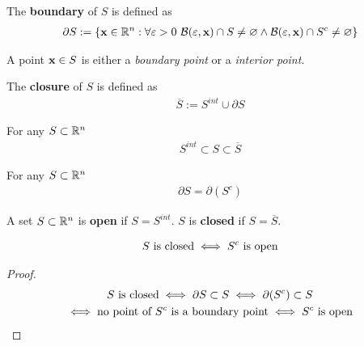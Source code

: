 \documentclass[11pt]{article}
\begin{document}
			\begin{definition}
				The \textbf{boundary} of $S$ is defined as
				\begin{gather}
					\partial S := \{\textbf{x} \in \mathbb{R}^n: \forall \varepsilon > 0\ \mathcal{{B}}(\varepsilon, \textbf{x}) \cap S \neq \varnothing \land \mathcal{{B}}(\varepsilon, \textbf{x}) \cap S^c \neq \varnothing \}
				\end{gather}
			\end{definition}
			
			\begin{theorem}
				A point $\textbf{x} \in S$ is either a \emph{boundary point} or a \emph{interior point}.
			\end{theorem}
			
			\begin{definition}
				The \textbf{closure} of $S$ is defined as 
				\begin{gather}
					\overline{S} := S^{int} \cup \partial S
				\end{gather}
			\end{definition}
			
			\begin{theorem}
				For any $S \subset \mathbb{R}^n$
				\begin{gather}
					S^{int} \subset S \subset \overline{S}
				\end{gather}
			\end{theorem}
			
			\begin{theorem}
				For any $S \subset \mathbb{R}^n$
				\begin{gather}
					\partial S = \partial (S^c)
				\end{gather}
			\end{theorem}
			
			\begin{definition}
				A set $S \subset \mathbb{R}^n$ is \textbf{open} if $S = S^{int}$. $S$ is \textbf{closed} if $S = \overline{S}$.
			\end{definition}
			
			\begin{theorem}
				\begin{gather}
					S \text{{ is closed}} \iff S^c \text{{ is open}}
				\end{gather}
				\begin{proof}
					\begin{gather}
						S \text{{ is closed}} \iff \partial S \subset S
						\iff \partial (S^c) \subset S \\
						\iff \text{{no point of $S^c$ is a boundary point}}
						\iff S^c \text{{ is open}}
					\end{gather}
				\end{proof}
			\end{theorem}
			
\end{document}
